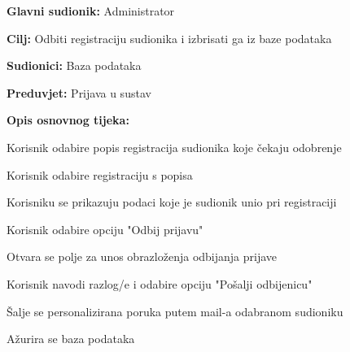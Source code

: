 					\noindent {}
					\begin{packed_item}
	
						\item \textbf{Glavni sudionik: } Administrator
						\item  \textbf{Cilj:} Odbiti registraciju sudionika i izbrisati ga iz baze podataka
						\item  \textbf{Sudionici:} Baza podataka
						\item  \textbf{Preduvjet:} Prijava u sustav
						\item  \textbf{Opis osnovnog tijeka:}
						
						\item[] \begin{packed_enum}
	
							\item Korisnik odabire popis registracija sudionika koje čekaju odobrenje
							\item Korisnik odabire registraciju s popisa
							\item Korisniku se prikazuju podaci koje je sudionik unio pri registraciji
							\item Korisnik odabire opciju "Odbij prijavu"
							\item Otvara se polje za unos obrazloženja odbijanja prijave
							\item Korisnik navodi razlog/e i odabire opciju "Pošalji odbijenicu"
							\item Šalje se personalizirana poruka putem mail-a odabranom sudioniku
							\item Ažurira se baza podataka

					
						\end{packed_enum}
			
					\end{packed_item}

